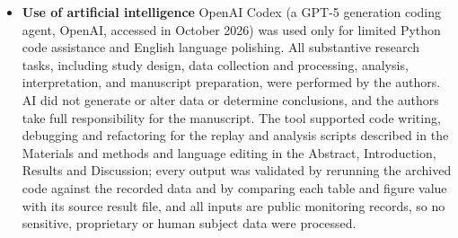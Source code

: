 \documentclass[pdflatex,sn-mathphys-num]{sn-jnl}%
\theoremstyle{thmstyleone}%
\theoremstyle{thmstyletwo}%
\theoremstyle{thmstylethree}%
\begin{document}
\begin{itemize}
\item \textbf{Use of artificial intelligence} OpenAI Codex (a GPT-5 generation coding agent, OpenAI, accessed in October 2026) was used only for limited Python code assistance and English language polishing. All substantive research tasks, including study design, data collection and processing, analysis, interpretation, and manuscript preparation, were performed by the authors. AI did not generate or alter data or determine conclusions, and the authors take full responsibility for the manuscript. The tool supported code writing, debugging and refactoring for the replay and analysis scripts described in the Materials and methods and language editing in the Abstract, Introduction, Results and Discussion; every output was validated by rerunning the archived code against the recorded data and by comparing each table and figure value with its source result file, and all inputs are public monitoring records, so no sensitive, proprietary or human subject data were processed.
\end{itemize}


\end{document}
